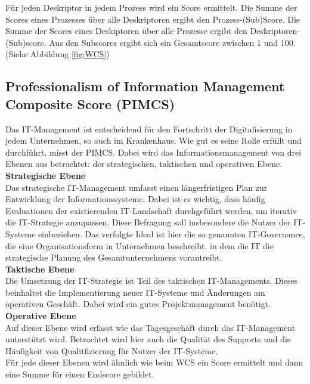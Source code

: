 	Für jeden Deskriptor in jedem Prozess wird ein Score ermittelt. Die Summe der Scores eines Prozesses über alle Deskriptoren ergibt den Prozess-(Sub)Score. Die Summe der Scores eines Deskiptoren über alle Prozesse ergibt den Deskriptoren-(Sub)score. Aus den Subscores ergibt sich ein Gesamtscore zwischen 1 und 100.(Siehe Abbildung \ref{fig:WCS})
\subsection{Professionalism of Information Management Composite Score (PIMCS)}
	Das IT-Management ist entscheidend für den Fortschritt der Digitalisierung in jedem Unternehmen, so auch im Krankenhaus. Wie gut es seine Rolle erfüllt und durchführt, misst der PIMCS. Dabei wird das Informationsmanagement von drei Ebenen aus betrachtet: der strategischen, taktischen und operativen Ebene. \parencite{huebner2019}
	\vspace{\parheadvspace}\\
	\textbf{Strategische Ebene}\\
	Das strategische IT-Management umfasst einen längerfristigen Plan zur Entwicklung der Informationssysteme. Dabei ist es wichtig, dass häufig Evaluationen der existierenden IT-Landschaft durchgeführt werden, um iterativ die IT-Strategie anzupassen. Diese Befragung soll insbesondere die Nutzer der IT-Systeme einbeziehen. Das verfolgte Ideal ist hier die so genannten IT-Governance, die eine Organisationsform in Unternehmen beschreibt, in dem die IT die strategische Planung des Gesamtunternehmens vorantreibt.
	\vspace{\parheadvspace}\\
	\textbf{Taktische Ebene}\\
	Die Umsetzung der IT-Strategie ist Teil des taktischen IT-Managements. Dieses beinhaltet die Implementierung neuer IT-Systeme und Änderungen am operativen Geschäft. Dabei wird ein gutes Projektmanagement benötigt.
	\vspace{\parheadvspace}\\
	\textbf{Operative Ebene}\\
	Auf dieser Ebene wird erfasst wie das Tagesgeschäft durch das IT-Management unterstützt wird. Betrachtet wird hier auch die Qualität des Supports und die Häufigkeit von Qualitfizierung für Nutzer der IT-Systeme.\\

	Für jede dieser Ebenen wird ähnlich wie beim WCS ein Score ermittelt und dann eine Summe für einen Endscore gebildet. \parencite{huebner2019}
